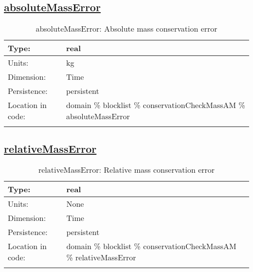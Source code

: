 \subsection[absoluteMassError]{\hyperref[sec:var_tab_conservationCheckMassAM]{absoluteMassError}}
\label{subsec:var_sec_conservationCheckMassAM_absoluteMassError}
\begin{center}
\begin{longtable}{| p{2.0in} | p{4.0in} |}
        \hline 
        Type: & real \\
        \hline 
        Units: & \si{kg} \\
        \hline 
        Dimension: & Time \\
        \hline 
        Persistence: & persistent \\
        \hline 
         Location in code: & domain \% blocklist \% conservationCheckMassAM \% absoluteMassError \\
         \hline 
    \caption{absoluteMassError: Absolute mass conservation error}
\end{longtable}
\end{center}
\subsection[relativeMassError]{\hyperref[sec:var_tab_conservationCheckMassAM]{relativeMassError}}
\label{subsec:var_sec_conservationCheckMassAM_relativeMassError}
\begin{center}
\begin{longtable}{| p{2.0in} | p{4.0in} |}
        \hline 
        Type: & real \\
        \hline 
        Units: & \si{None} \\
        \hline 
        Dimension: & Time \\
        \hline 
        Persistence: & persistent \\
        \hline 
         Location in code: & domain \% blocklist \% conservationCheckMassAM \% relativeMassError \\
         \hline 
    \caption{relativeMassError: Relative mass conservation error}
\end{longtable}
\end{center}
